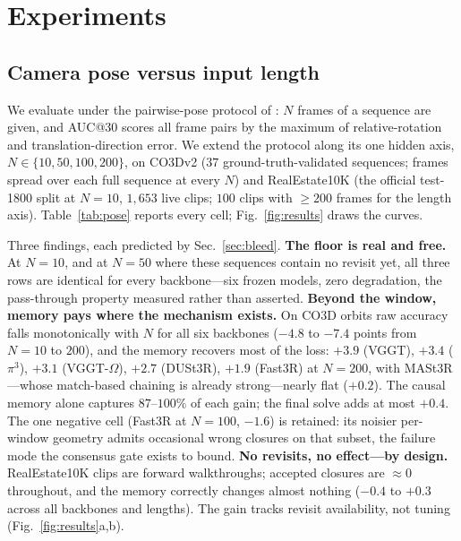 \documentclass{article}
\begin{document}
\section{Experiments}
\label{sec:experiments}

\subsection{Camera pose versus input length}
\label{sec:results-pose}
We evaluate under the pairwise-pose protocol of \citet{vggt}: $N$ frames of
a sequence are given, and AUC@30 \citep{relposepp,posediffusion} scores all
frame pairs by the maximum of relative-rotation and translation-direction
error. We extend the protocol along its one hidden axis,
$N\in\{10,50,100,200\}$, on CO3Dv2 ($37$ ground-truth-validated sequences;
frames spread over each full sequence at every $N$) and RealEstate10K (the
official test-1800 split at $N{=}10$, $1{,}653$ live clips; $100$ clips with
${\ge}200$ frames for the length axis). Table~\ref{tab:pose} reports every
cell; Fig.~\ref{fig:results} draws the curves.




Three findings, each predicted by Sec.~\ref{sec:bleed}. \textbf{The floor is
real and free.} At $N{=}10$, and at $N{=}50$ where these sequences contain no
revisit yet, all three rows are identical for every backbone---six frozen
models, zero degradation, the pass-through property measured rather than
asserted. \textbf{Beyond the window, memory pays where the mechanism
exists.} On CO3D orbits raw accuracy falls monotonically with $N$ for all six
backbones ($-4.8$ to $-7.4$ points from $N{=}10$ to $200$), and the memory
recovers most of the loss: $+3.9$ (VGGT), $+3.4$ ($\pi^3$), $+3.1$
(VGGT-$\Omega$), $+2.7$ (DUSt3R), $+1.9$ (Fast3R) at $N{=}200$, with
MASt3R---whose match-based chaining is already strong---nearly flat
($+0.2$). The causal memory alone captures $87$--$100\%$ of each gain; the
final solve adds at most $+0.4$. The one negative cell (Fast3R at
$N{=}100$, $-1.6$) is retained: its noisier per-window geometry admits
occasional wrong closures on that subset, the failure mode the consensus
gate exists to bound. \textbf{No revisits, no effect---by design.}
RealEstate10K clips are forward walkthroughs; accepted closures are
${\approx}0$ throughout, and the memory correctly changes almost nothing
($-0.4$ to $+0.3$ across all backbones and lengths). The gain tracks revisit
availability, not tuning (Fig.~\ref{fig:results}a,b).
\end{document}

